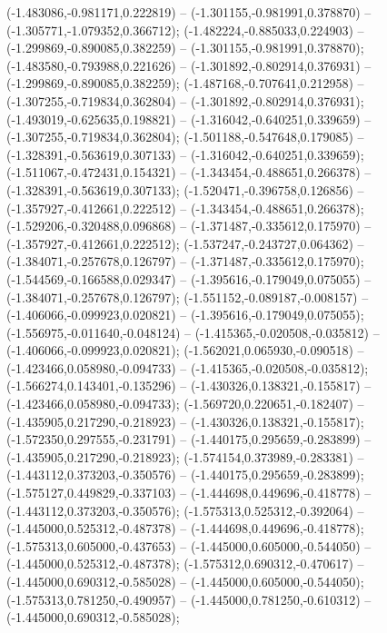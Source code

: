  (-1.483086,-0.981171,0.222819) -- (-1.301155,-0.981991,0.378870) -- (-1.305771,-1.079352,0.366712);
 (-1.482224,-0.885033,0.224903) -- (-1.299869,-0.890085,0.382259) -- (-1.301155,-0.981991,0.378870);
 (-1.483580,-0.793988,0.221626) -- (-1.301892,-0.802914,0.376931) -- (-1.299869,-0.890085,0.382259);
 (-1.487168,-0.707641,0.212958) -- (-1.307255,-0.719834,0.362804) -- (-1.301892,-0.802914,0.376931);
 (-1.493019,-0.625635,0.198821) -- (-1.316042,-0.640251,0.339659) -- (-1.307255,-0.719834,0.362804);
 (-1.501188,-0.547648,0.179085) -- (-1.328391,-0.563619,0.307133) -- (-1.316042,-0.640251,0.339659);
 (-1.511067,-0.472431,0.154321) -- (-1.343454,-0.488651,0.266378) -- (-1.328391,-0.563619,0.307133);
 (-1.520471,-0.396758,0.126856) -- (-1.357927,-0.412661,0.222512) -- (-1.343454,-0.488651,0.266378);
 (-1.529206,-0.320488,0.096868) -- (-1.371487,-0.335612,0.175970) -- (-1.357927,-0.412661,0.222512);
 (-1.537247,-0.243727,0.064362) -- (-1.384071,-0.257678,0.126797) -- (-1.371487,-0.335612,0.175970);
 (-1.544569,-0.166588,0.029347) -- (-1.395616,-0.179049,0.075055) -- (-1.384071,-0.257678,0.126797);
 (-1.551152,-0.089187,-0.008157) -- (-1.406066,-0.099923,0.020821) -- (-1.395616,-0.179049,0.075055);
 (-1.556975,-0.011640,-0.048124) -- (-1.415365,-0.020508,-0.035812) -- (-1.406066,-0.099923,0.020821);
 (-1.562021,0.065930,-0.090518) -- (-1.423466,0.058980,-0.094733) -- (-1.415365,-0.020508,-0.035812);
 (-1.566274,0.143401,-0.135296) -- (-1.430326,0.138321,-0.155817) -- (-1.423466,0.058980,-0.094733);
 (-1.569720,0.220651,-0.182407) -- (-1.435905,0.217290,-0.218923) -- (-1.430326,0.138321,-0.155817);
 (-1.572350,0.297555,-0.231791) -- (-1.440175,0.295659,-0.283899) -- (-1.435905,0.217290,-0.218923);
 (-1.574154,0.373989,-0.283381) -- (-1.443112,0.373203,-0.350576) -- (-1.440175,0.295659,-0.283899);
 (-1.575127,0.449829,-0.337103) -- (-1.444698,0.449696,-0.418778) -- (-1.443112,0.373203,-0.350576);
 (-1.575313,0.525312,-0.392064) -- (-1.445000,0.525312,-0.487378) -- (-1.444698,0.449696,-0.418778);
 (-1.575313,0.605000,-0.437653) -- (-1.445000,0.605000,-0.544050) -- (-1.445000,0.525312,-0.487378);
 (-1.575312,0.690312,-0.470617) -- (-1.445000,0.690312,-0.585028) -- (-1.445000,0.605000,-0.544050);
 (-1.575313,0.781250,-0.490957) -- (-1.445000,0.781250,-0.610312) -- (-1.445000,0.690312,-0.585028);
